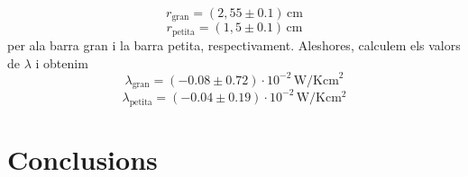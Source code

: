 \documentclass[12pt,twosides,onecolumn,openany]{article}
\begin{document}
\begin{multicols}{2}
\begin{equation*}
  r_{\text{gran}} = (2,55\pm0.1)\, \text{cm}
\end{equation*}
\begin{equation*}
  r_{\text{petita}} = (1,5\pm0.1)\, \text{cm}
\end{equation*}
per ala barra gran i la barra petita, respectivament. Aleshores, calculem els valors de $\lambda$ i obtenim
\begin{equation*}
  \lambda_{\text{gran}} = (-0.08\pm0.72)\cdot 10^{-2} \, \text{W}/\text{Kcm}^{2}
\end{equation*}
\begin{equation*}
  \lambda_{\text{petita}} = (-0.04\pm0.19)\cdot 10^{-2} \, \text{W}/\text{K}\text{cm}^{2}
\end{equation*}
\section{Conclusions}
\end{multicols}
\end{document}
